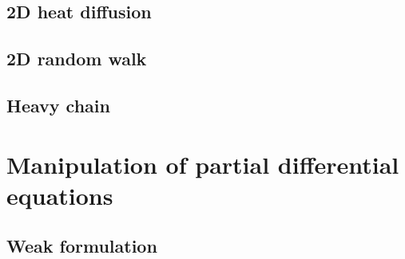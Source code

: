 \subsection{2D heat diffusion}


\subsection{2D random walk}


\subsection{Heavy chain}


\section{Manipulation of partial differential equations}

\subsection{Weak formulation}

